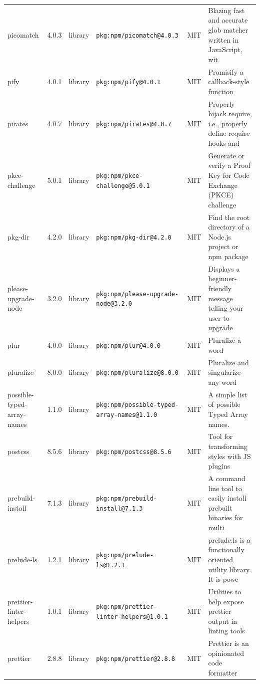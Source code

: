 \documentclass[11pt,a4paper]{article}
\begin{document}
\begin{longtable}{|p{4cm}|p{2cm}|p{1.6cm}|p{5cm}|p{1.5cm}|p{3.5cm}|}
\raggedright picomatch & 4.0.3 & library & \small\texttt{pkg:npm/picomatch@4.0.3} & MIT & \small Blazing fast and accurate glob matcher written in JavaScript, wit \\
\raggedright pify & 4.0.1 & library & \small\texttt{pkg:npm/pify@4.0.1} & MIT & \small Promisify a callback-style function \\
\raggedright pirates & 4.0.7 & library & \small\texttt{pkg:npm/pirates@4.0.7} & MIT & \small Properly hijack require, i.e., properly define require hooks and  \\
\raggedright pkce-challenge & 5.0.1 & library & \small\texttt{pkg:npm/pkce-challenge@5.0.1} & MIT & \small Generate or verify a Proof Key for Code Exchange (PKCE) challenge \\
\raggedright pkg-dir & 4.2.0 & library & \small\texttt{pkg:npm/pkg-dir@4.2.0} & MIT & \small Find the root directory of a Node.js project or npm package \\
\raggedright please-upgrade-node & 3.2.0 & library & \small\texttt{pkg:npm/please-upgrade-node@3.2.0} & MIT & \small Displays a beginner-friendly message telling your user to upgrade \\
\raggedright plur & 4.0.0 & library & \small\texttt{pkg:npm/plur@4.0.0} & MIT & \small Pluralize a word \\
\raggedright pluralize & 8.0.0 & library & \small\texttt{pkg:npm/pluralize@8.0.0} & MIT & \small Pluralize and singularize any word \\
\raggedright possible-typed-array-names & 1.1.0 & library & \small\texttt{pkg:npm/possible-typed-array-names@1.1.0} & MIT & \small A simple list of possible Typed Array names. \\
\raggedright postcss & 8.5.6 & library & \small\texttt{pkg:npm/postcss@8.5.6} & MIT & \small Tool for transforming styles with JS plugins \\
\raggedright prebuild-install & 7.1.3 & library & \small\texttt{pkg:npm/prebuild-install@7.1.3} & MIT & \small A command line tool to easily install prebuilt binaries for multi \\
\raggedright prelude-ls & 1.2.1 & library & \small\texttt{pkg:npm/prelude-ls@1.2.1} & MIT & \small prelude.ls is a functionally oriented utility library. It is powe \\
\raggedright prettier-linter-helpers & 1.0.1 & library & \small\texttt{pkg:npm/prettier-linter-helpers@1.0.1} & MIT & \small Utilities to help expose prettier output in linting tools \\
\raggedright prettier & 2.8.8 & library & \small\texttt{pkg:npm/prettier@2.8.8} & MIT & \small Prettier is an opinionated code formatter \\

\end{longtable}
\end{document}
